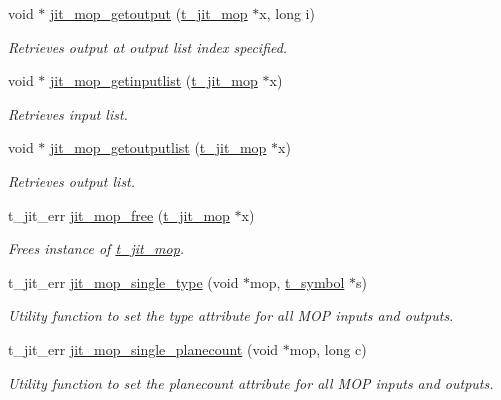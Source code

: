 \begin{DoxyCompactItemize}
void $\ast$ \hyperlink{group__mopmod_ga372b391a6398e456818fbd9b0a023ea8}{jit\_\-mop\_\-getoutput} (\hyperlink{structt__jit__mop}{t\_\-jit\_\-mop} $\ast$x, long i)
\begin{DoxyCompactList}\small\item\em Retrieves output at output list index specified. \item\end{DoxyCompactList}\item 
void $\ast$ \hyperlink{group__mopmod_ga311291c98d02778c52d096c591b782af}{jit\_\-mop\_\-getinputlist} (\hyperlink{structt__jit__mop}{t\_\-jit\_\-mop} $\ast$x)
\begin{DoxyCompactList}\small\item\em Retrieves input list. \item\end{DoxyCompactList}\item 
void $\ast$ \hyperlink{group__mopmod_gab75982f45862072738e43a9423f2bcd4}{jit\_\-mop\_\-getoutputlist} (\hyperlink{structt__jit__mop}{t\_\-jit\_\-mop} $\ast$x)
\begin{DoxyCompactList}\small\item\em Retrieves output list. \item\end{DoxyCompactList}\item 
t\_\-jit\_\-err \hyperlink{group__mopmod_ga3d1628d4dff72d5b10a186027a15c08f}{jit\_\-mop\_\-free} (\hyperlink{structt__jit__mop}{t\_\-jit\_\-mop} $\ast$x)
\begin{DoxyCompactList}\small\item\em Frees instance of \hyperlink{structt__jit__mop}{t\_\-jit\_\-mop}. \item\end{DoxyCompactList}\item 
t\_\-jit\_\-err \hyperlink{group__mopmod_ga8923e590eaf3cdb7d92c7f982ddc169f}{jit\_\-mop\_\-single\_\-type} (void $\ast$mop, \hyperlink{structt__symbol}{t\_\-symbol} $\ast$s)
\begin{DoxyCompactList}\small\item\em Utility function to set the type attribute for all MOP inputs and outputs. \item\end{DoxyCompactList}\item 
t\_\-jit\_\-err \hyperlink{group__mopmod_gada02eaa2a5dc001cdb120a83cb093e25}{jit\_\-mop\_\-single\_\-planecount} (void $\ast$mop, long c)
\begin{DoxyCompactList}\small\item\em Utility function to set the planecount attribute for all MOP inputs and outputs. \item\end{DoxyCompactList}\item 

\end{DoxyCompactItemize}
